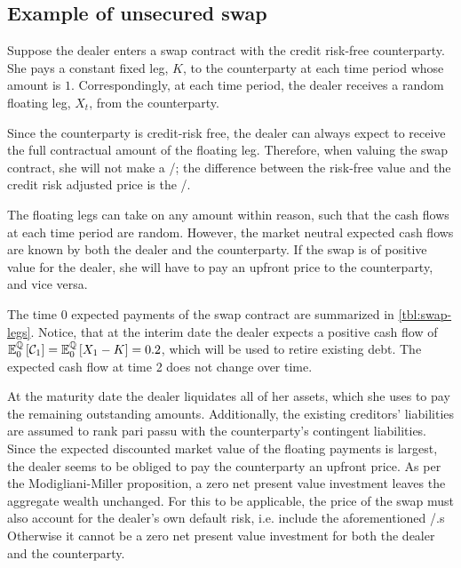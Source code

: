 \documentclass[main.tex]{subfiles}
\begin{document}
        \subsection{Example of unsecured swap}
            Suppose the dealer enters a swap contract with the credit risk-free counterparty.
            She pays a constant fixed leg, $K$, to the counterparty at each time period whose amount is $\num{1}$.
            Correspondingly, at each time period,
            the dealer receives a random floating leg, $X_t$, from the counterparty.

            Since the counterparty is credit-risk free,
            the dealer can always expect to receive the full contractual amount of the floating leg.
            Therefore, when valuing the swap contract,
            she will not make a \CVA/; 
            the difference between the risk-free value and the credit risk adjusted price is the \DVA/.

            The floating legs can take on any amount within reason,
            such that the cash flows at each time period are random.
            However, the market neutral expected cash flows are known
            by both the dealer and the counterparty.
            If the swap is of positive value for the dealer,
            she will have to pay an upfront price to the counterparty,
            and vice versa.

            The time 0 expected payments of the swap contract are summarized in \cref{tbl:swap-legs}.
            Notice, that at the interim date the dealer expects a positive cash flow of
            $\mathbb{E}_{0}^{\mathbb{Q}}\left[\mathcal{C}_1\right] = \mathbb{E}_{0}^{\mathbb{Q}}\left[X_1 - K\right] = \num{0.2}$,
            which will be used to retire existing debt.
            The expected cash flow at time 2 does not change over time.

            At the maturity date the dealer liquidates all of her assets,
            which she uses to pay the remaining outstanding amounts.
            Additionally, the existing creditors' liabilities are assumed to rank pari passu with the counterparty's contingent liabilities.
            \\
            Since the expected discounted market value of the floating payments is largest,
            the dealer seems to be obliged to pay the counterparty an upfront price.
            As per the Modigliani-Miller proposition, 
            a zero net present value investment leaves the aggregate wealth unchanged.
            For this to be applicable, the price of the swap must also account for the dealer's own default risk,
            i.e. include the aforementioned \DVA/.s
            Otherwise it cannot be a zero net present value investment for both the dealer and the counterparty.
            
\end{document}
